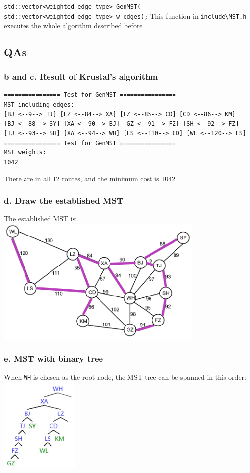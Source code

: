 \texttt{std::vector<weighted_edge_type> GenMST(}\newline \texttt{                     std::vector<weighted_edge_type> w_edges);}\newline
This function in \verb|include\MST.h| executes the whole algorithm described before

\subsection{QAs}
\subsubsection*{b and c. Result of Krustal's algorithm}
\begin{verbatim}
================ Test for GenMST ================
MST including edges:
[BJ <--9--> TJ] [LZ <--84--> XA] [LZ <--85--> CD] [CD <--86--> KM] 
[BJ <--88--> SY] [XA <--90--> BJ] [GZ <--91--> FZ] [SH <--92--> FZ] 
[TJ <--93--> SH] [XA <--94--> WH] [LS <--110--> CD] [WL <--120--> LS] 
================ Test for GenMST ================
MST weights:
1042
\end{verbatim}
There are in all $12$ routes, and the minimum cost is $1042$

\subsubsection*{d. Draw the established MST}
The established MST is: \newline
\includegraphics[width=4in]{content/mst.png}


\subsubsection*{e. MST with binary tree}
When \verb|WH| is chosen as the root node, the MST tree can be spanned in this order: \newline
\includegraphics[width=1.5in]{content/bin.jpg}

